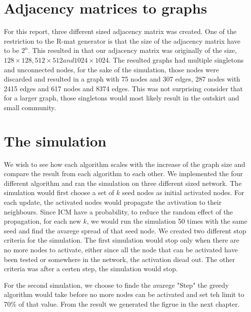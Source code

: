 \section{Adjacency matrices to graphs}
For this report, three different sized adjacency matrix was created. One of the restriction to the R-mat generator is that the size of the adjacency matrix have to be $2^n$. This resulted in that our adjacency matrix was originally of the size, $128 \times 128, 512 \times 512 and 1024 \times 1024$. The resulted graphs had multiple singletons and unconnected nodes, for the sake of the simulation, those nodes were discarded and resulted in a graph with 75 nodes and 307 edges, 287 nodes with 2415 edges and 617 nodes and 8374 edges. This was not surprising consider that for a larger graph, those singletons would most likely result in the outskirt and small community.



\section{The simulation}
We wish to see how each algorithm scales with the increase of the graph size and compare the result from each algorithm to each other. We implemented the four different algorithm and ran the simulation on three different sized network. The simulation would first choose a set of $k$ seed nodes as initial activated nodes. For each update, the activated nodes would propagate the avtivation to their neighbours. Since ICM have a probability, to reduce the random effect of the propagation, for each new $k$, we would run the simulation 50 times with the same seed and find the avarege spread of that seed node. We created two different stop criteria for the simulation. The first simulation would stop only when there are no more nodes to activate, either since all the node that can be activated have been tested or somewhere in the network, the activation diead out. The other criteria was after a certen step, the simulation would stop.

For the second simulation, we choose to finde the avarege "Step" the greedy algorithm would take before no more nodes can be activated and set teh limit to 70\% of that value. From the result we generated the figrue in the next chapter.
